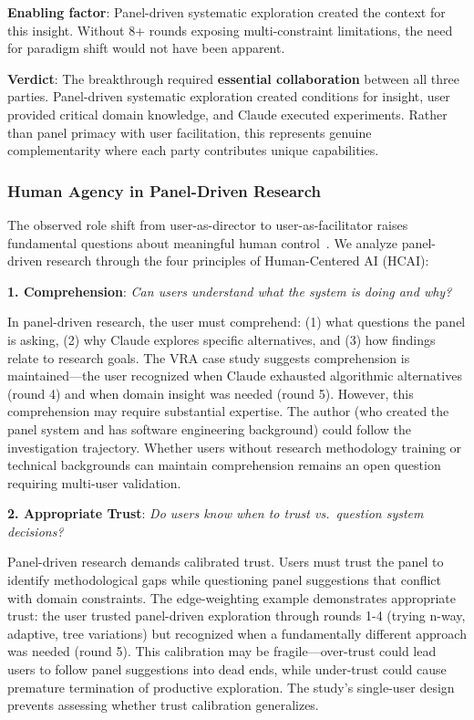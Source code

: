 \textbf{Enabling factor}: Panel-driven systematic exploration created the context for this insight. Without 8+ rounds exposing multi-constraint limitations, the need for paradigm shift would not have been apparent.

\textbf{Verdict}: The breakthrough required \textbf{essential collaboration} between all three parties. Panel-driven systematic exploration created conditions for insight, user provided critical domain knowledge, and Claude executed experiments. Rather than panel primacy with user facilitation, this represents genuine complementarity where each party contributes unique capabilities.

\subsubsection{Human Agency in Panel-Driven Research}

The observed role shift from user-as-director to user-as-facilitator raises fundamental questions about meaningful human control~\cite{shneiderman2022human}. We analyze panel-driven research through the four principles of Human-Centered AI (HCAI):

\textbf{1. Comprehension}: \textit{Can users understand what the system is doing and why?}

In panel-driven research, the user must comprehend: (1) what questions the panel is asking, (2) why Claude explores specific alternatives, and (3) how findings relate to research goals. The VRA case study suggests comprehension is maintained---the user recognized when Claude exhausted algorithmic alternatives (round 4) and when domain insight was needed (round 5). However, this comprehension may require substantial expertise. The author (who created the panel system and has software engineering background) could follow the investigation trajectory. Whether users without research methodology training or technical backgrounds can maintain comprehension remains an open question requiring multi-user validation.

\textbf{2. Appropriate Trust}: \textit{Do users know when to trust vs.\ question system decisions?}

Panel-driven research demands calibrated trust. Users must trust the panel to identify methodological gaps while questioning panel suggestions that conflict with domain constraints. The edge-weighting example demonstrates appropriate trust: the user trusted panel-driven exploration through rounds 1-4 (trying n-way, adaptive, tree variations) but recognized when a fundamentally different approach was needed (round 5). This calibration may be fragile---over-trust could lead users to follow panel suggestions into dead ends, while under-trust could cause premature termination of productive exploration. The study's single-user design prevents assessing whether trust calibration generalizes.

